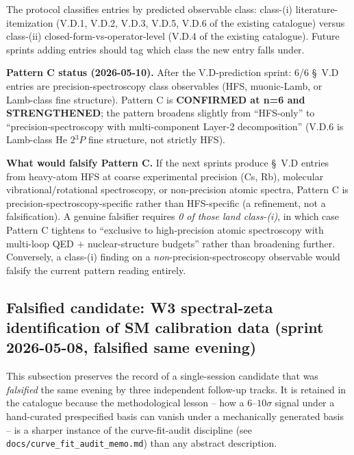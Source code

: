 \documentclass[11pt]{article}
\begin{document}
The protocol classifies entries by predicted observable class:
class-(i) literature-itemization (V.D.1, V.D.2, V.D.3, V.D.5, V.D.6
of the existing catalogue) versus class-(ii) closed-form-vs-operator-level
(V.D.4 of the existing catalogue).  Future sprints adding entries
should tag which class the new entry falls under.

\textbf{Pattern C status (2026-05-10).}  After the V.D-prediction sprint:
6/6 \S~V.D entries are precision-spectroscopy class observables
(HFS, muonic-Lamb, or Lamb-class fine structure).  Pattern C is
\textbf{CONFIRMED at n=6 and STRENGTHENED}; the pattern broadens
slightly from ``HFS-only'' to ``precision-spectroscopy with
multi-component Layer-2 decomposition'' (V.D.6 is Lamb-class He
$2{}^3P$ fine structure, not strictly HFS).

\textbf{What would falsify Pattern C.}  If the next sprints produce
\S~V.D entries from heavy-atom HFS at coarse experimental precision
(Cs, Rb), molecular vibrational/rotational spectroscopy, or
non-precision atomic spectra, Pattern C is precision-spectroscopy-specific
rather than HFS-specific (a refinement, not a falsification).
A genuine falsifier requires \emph{0 of those land class-(i)}, in
which case Pattern C tightens to ``exclusive to high-precision atomic
spectroscopy with multi-loop QED $+$ nuclear-structure budgets''
rather than broadening further.  Conversely, a class-(i) finding on
a \emph{non}-precision-spectroscopy observable would falsify the
current pattern reading entirely.

\subsection{Falsified candidate: W3 spectral-zeta identification of
SM calibration data (sprint 2026-05-08, falsified same evening)}
\label{sec:calibration_candidates}

This subsection preserves the record of a single-session candidate
that was \emph{falsified} the same evening by three independent
follow-up tracks.  It is retained in the catalogue because the
methodological lesson -- how a $6$--$10\sigma$ signal under a
hand-curated prespecified basis can vanish under a mechanically
generated basis -- is a sharper instance of the curve-fit-audit
discipline (see \texttt{docs/curve\_fit\_audit\_memo.md}) than any
abstract description.
\end{document}
